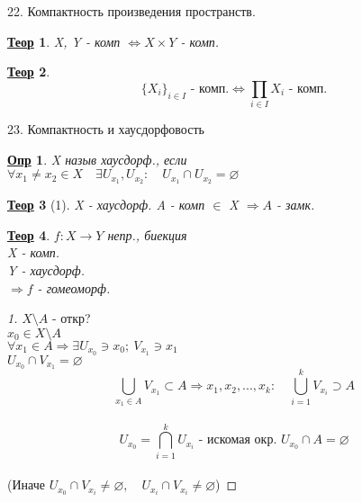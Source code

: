 \documentclass[12pt, fleqn]{article}
\newenvironment{question}[1]{\hspace*{-4em} #1}{\newpage}
\newcommand{\ra}{\Rightarrow}
\newcommand{\rla}{\Leftrightarrow}
\newcommand{\q}{\quad}
\theoremstyle{nonumbermarginbreak}
\newtheorem{theorem}{\hspace*{-2em}\underline{\bfseries Теор}}[section]
\newtheorem{definition}{\hspace*{-2em}\underline{\bfseries Опр}}[section]
\newtheorem{proof}{\hspace*{-2em}\underline{\bfseries Док-во}}[section]
\begin{document}
    \begin{question}{22. Компактность произведения пространств.}
        \begin{theorem} 
            X, Y - комп $\rla X \times Y$ - комп.
        \end{theorem}
        
        \begin{theorem} 
            \[\{X_i\}_{i \in I} \text{ - комп.} \rla \prod_{i \in I} X_i \text{ - комп.}\]
        \end{theorem}
    \end{question}

    \begin{question}{23. Компактность и хаусдорфовость}
        \begin{definition} 
            X назыв хаусдорф., если\\
            $\forall x_1 \neq x_2 \in X \q \exists U_{x_1}, U_{x_2}: \q U_{x_1} \cap U_{x_2} = \varnothing$
        \end{definition}
        
        \begin{theorem}[1] 
            X - хаусдорф. A - комп $\in$ X $\ra A$ - замк.
        \end{theorem}

        \begin{theorem} 
            $f: X \rightarrow Y$ непр., биекция\\
            X - комп.\\
            Y - хаусдорф.\\
            $\ra f$ - гомеоморф.
        \end{theorem}

        \begin{proof} [1]
            $X \setminus A$ - откр?\\
            $x_0 \in X \setminus A$\\
            $\forall x_1 \in A \ra \exists U_{x_0} \ni x_0; \ V_{x_1} \ni x_1$\\
            $U_{x_0} \cap V_{x_1} = \varnothing$\\
            \[\bigcup_{x_1 \in A} V_{x_1} \subset A \ra x_1, x_2, ..., x_k: 
            \q \bigcup_{i = 1}^k V_{x_i} \supset A\]\\
            \[U_{x_0} = \bigcap_{i = 1}^k U_{x_i} \text{ - искомая окр.  } U_{x_0} \cap A = \varnothing\]\\
            (Иначе $U_{x_0} \cap V_{x_i} \neq \varnothing, \q U_{x_i} \cap V_{x_i} \neq \varnothing$)
        \end{proof}
    \end{question}
\end{document}
